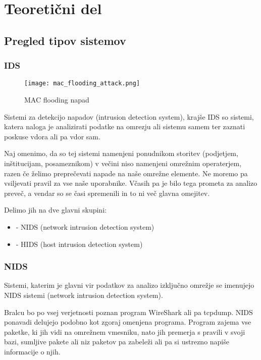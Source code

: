 \documentclass[12pt]{article}
\let\stdsection\section
\renewcommand\section{\newpage\stdsection}
\begin{document}
\section{Teoretični del}

\subsection{Pregled tipov sistemov}
 
\subsubsection{IDS}

\begin{figure}[htb]
\begin{center}
\texttt{[image: mac\_flooding\_attack.png]}
\end{center}
\caption{MAC flooding napad}
\label{mac_flooding}
\end{figure}

Sistemi za detekcijo napadov (intrusion detection system), krajše IDS
so sistemi, katera naloga je analizirati podatke na omrezju ali sistemu samem
ter zaznati poskuse vdora ali pa vdor sam.

Naj omenimo, da so tej sistemi namenjeni ponudnikom storitev (podjetjem, inštitucijam, posameznikom)
v večini niso namenjeni omrežnim operaterjem, razen če želimo preprečevati napade na naše omrežne elemente. 
Ne moremo pa vsiljevati pravil za vse naše uporabnike. Včasih pa je bilo tega prometa za analizo preveč, a vendar
so se časi spremenili in to ni več glavna omejitev.

Delimo jih na dve glavni skupini:

\begin{itemize}
    \item - NIDS (network intrusion detection system)
    \item - HIDS (host intrusion detection system)
\end{itemize}

\subsubsection{NIDS}

Sistemi, katerim je glavni vir podatkov za analizo izključno omrežje se imenujejo NIDS sistemi (network intrusion detection system).

Bralcu bo po vsej verjetnosti poznan program WireShark ali pa tcpdump.
NIDS ponavadi delujejo podobno kot zgoraj omenjena programa. Program zajema vse paketke, ki jih vidi na omrežnem vmesniku,
nato jih premerja s pravili v svoji bazi, sumljive pakete ali niz paketov pa zabeleži ali pa si ustrezno napiše informacije o njih.
\end{document}
